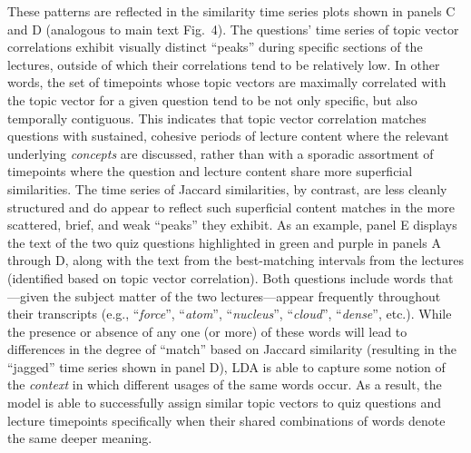 \documentclass[10pt]{article}
\newcommand{\questionCorrs}{4}
\begin{document}
These patterns are reflected in the similarity time series plots shown in panels 
C and D (analogous to main text Fig.~\questionCorrs). The questions' time series 
of topic vector correlations exhibit visually distinct ``peaks'' during specific 
sections of the lectures, outside of which their correlations tend to be 
relatively low. In other words, the set of timepoints whose topic vectors are 
maximally correlated with the topic vector for a given question tend to be not 
only specific, but also temporally contiguous. This indicates that topic vector 
correlation matches questions with sustained, cohesive periods of lecture 
content where the relevant underlying \textit{concepts} are discussed, rather 
than with a sporadic assortment of timepoints where the question and lecture 
content share more superficial similarities. The time series of Jaccard 
similarities, by contrast, are less cleanly structured and do appear to reflect 
such superficial content matches in the more scattered, brief, and weak 
``peaks'' they exhibit. As an example, panel E displays the text of the two quiz 
questions highlighted in green and purple in panels A through D, along with the 
text from the best-matching intervals from the lectures (identified based on
topic vector correlation). Both questions include words that---given the subject 
matter of the two lectures---appear frequently throughout their transcripts 
(e.g., ``\textit{force}'', ``\textit{atom}'', ``\textit{nucleus}'', 
``\textit{cloud}'', ``\textit{dense}'', etc.). While the presence or absence of 
any one (or more) of these words will lead to differences in the degree of 
``match'' based on Jaccard similarity (resulting in the ``jagged'' time series
shown in panel D), LDA is able to capture some notion of the \textit{context} in 
which different usages of the same words occur. As a result, the model is able 
to successfully assign similar topic vectors to quiz questions and lecture 
timepoints specifically when their shared combinations of words denote the same 
deeper meaning.

\clearpage

\renewcommand{\refname}{Supplementary references}

\end{document}
